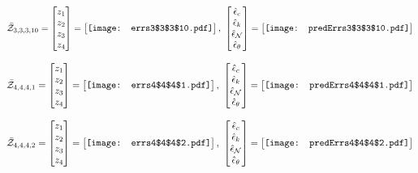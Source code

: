 \documentclass[12pt]{article}
\begin{document}
\begin{gather*}
\bar{\mathcal{Z}}_{3,3,3,10}=\begin{bmatrix}
z_1\\
z_2\\
z_3\\
z_4
 \end{bmatrix}= \begin{bmatrix}
\vcenter{\hbox{\texttt{[image: errs3\$3\$3\$10.pdf]}}}
 \end{bmatrix},\,\, \begin{bmatrix}
\hat{\epsilon}_c\\\hat{\epsilon}_k\\\hat{\epsilon}_\mathcal{N}\\\hat{\epsilon}_\theta
 \end{bmatrix}=\begin{bmatrix}
\vcenter{\hbox{\texttt{[image: predErrs3\$3\$3\$10.pdf]}}}
 \end{bmatrix}
\end{gather*}



\begin{gather*}
\bar{\mathcal{Z}}_{4,4,4,1}=\begin{bmatrix}
z_1\\
z_2\\
z_3\\
z_4
 \end{bmatrix}= \begin{bmatrix}
\vcenter{\hbox{\texttt{[image: errs4\$4\$4\$1.pdf]}}}
 \end{bmatrix},\,\, \begin{bmatrix}
\hat{\epsilon}_c\\\hat{\epsilon}_k\\\hat{\epsilon}_\mathcal{N}\\\hat{\epsilon}_\theta
 \end{bmatrix}=\begin{bmatrix}
\vcenter{\hbox{\texttt{[image: predErrs4\$4\$4\$1.pdf]}}}
 \end{bmatrix}
\end{gather*}


\begin{gather*}
\bar{\mathcal{Z}}_{4,4,4,2}=\begin{bmatrix}
z_1\\
z_2\\
z_3\\
z_4
 \end{bmatrix}= \begin{bmatrix}
\vcenter{\hbox{\texttt{[image: errs4\$4\$4\$2.pdf]}}}
 \end{bmatrix},\,\, \begin{bmatrix}
\hat{\epsilon}_c\\\hat{\epsilon}_k\\\hat{\epsilon}_\mathcal{N}\\\hat{\epsilon}_\theta
 \end{bmatrix}=\begin{bmatrix}
\vcenter{\hbox{\texttt{[image: predErrs4\$4\$4\$2.pdf]}}}
 \end{bmatrix}
\end{gather*}
\end{document}
